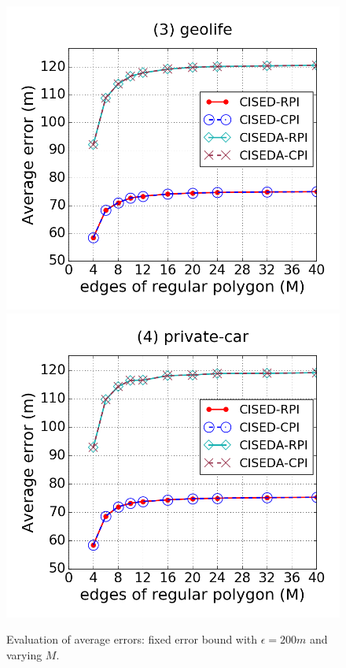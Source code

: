 \begin{figure}[tb!]
\includegraphics[scale = 0.250]{figures/Exp-M-e-200-error-geolife.png}
\includegraphics[scale = 0.250]{figures/Exp-M-e-200-error-private.png}
\vspace{-2ex}
\caption{\small Evaluation of average errors: fixed error bound with $\epsilon = 200m$ and varying $M$.}
\label{fig:m-error-e200}
\vspace{-2ex}
\end{figure}




